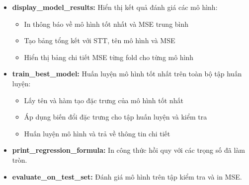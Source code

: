 \begin{itemize}
	\item \textbf{display\_model\_results:} Hiển thị kết quả đánh giá các mô hình:
	      \begin{itemize}
		      \item In thông báo về mô hình tốt nhất và MSE trung bình
		      \item Tạo bảng tổng kết với STT, tên mô hình và MSE
		      \item Hiển thị bảng chi tiết MSE từng fold cho từng mô hình
	      \end{itemize}

	\item \textbf{train\_best\_model:} Huấn luyện mô hình tốt nhất trên toàn bộ tập huấn luyện:
	      \begin{itemize}
		      \item Lấy tên và hàm tạo đặc trưng của mô hình tốt nhất
		      \item Áp dụng biến đổi đặc trưng cho tập huấn luyện và kiểm tra
		      \item Huấn luyện mô hình và trả về thông tin chi tiết
	      \end{itemize}

	\item \textbf{print\_regression\_formula:} In công thức hồi quy với các trọng số đã làm tròn.

	\item \textbf{evaluate\_on\_test\_set:} Đánh giá mô hình trên tập kiểm tra và in MSE.
\end{itemize}
